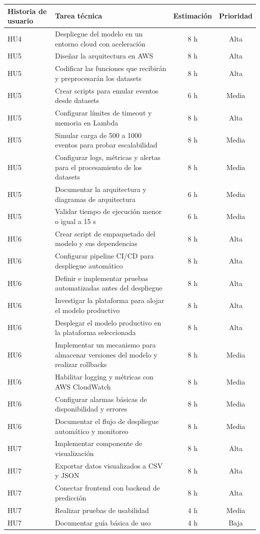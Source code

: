 \documentclass[
11pt, %
]{charter}
\begin{document}
\begin{table}[htpb]
\centering
\begin{tabularx}{\linewidth}{@{}|X|X|c|c|@{}}
\hline
\rowcolor[HTML]{C0C0C0}
Historia de usuario & Tarea técnica & Estimación & Prioridad \\ \hline
HU4 & Despliegue del modelo en un entorno cloud con aceleración 					 & 8 h & Alta \\ \hline
HU5 & Diseñar la arquitectura en AWS & 8 h & Alta \\ \hline
HU5 & Codificar las funciones que recibirán y preprocesarán los datasets 					 & 8 h & Alta \\ \hline
HU5 & Crear scripts para emular eventos desde datasets 						 & 6 h & Media \\ \hline
HU5 & Configurar límites de timeout y memoria en Lambda	 					 & 8 h & Alta \\ \hline
HU5 & Simular carga de 500 a 1000 eventos para probar escalabilidad		 					 & 8 h & Media \\ \hline
HU5 & Configurar logs, métricas y alertas para el procesamiento de los datasets 					 & 8 h & Media \\ \hline
HU5 & Documentar la arquitectura y diagramas de arquitectura 					 & 6 h & Media \\ \hline
HU5 & Validar tiempo de ejecución menor o igual a 15 s 					 & 6 h & Media \\ \hline
HU6 & Crear script de empaquetado del modelo y sus dependencias 					 & 8 h & Alta \\ \hline
HU6 & Configurar pipeline CI/CD para despliegue automático 					 & 8 h & Alta \\ \hline
HU6 & Definir e implementar pruebas automatizadas antes del despliegue 					 & 8 h & Alta \\ \hline
HU6 & Investigar la plataforma para alojar el modelo productivo  					 & 8 h & Alta \\ \hline
HU6 & Desplegar el modelo productivo en la plataforma seleccionada  					 & 8 h & Alta \\ \hline
HU6 & Implementar un mecanismo para almacenar versiones del modelo y realizar rollbacks	 					 & 8 h & Media \\ \hline
HU6 & Habilitar logging y métricas con AWS CloudWatch	 					 & 8 h & Media \\ \hline
HU6 & Configurar alarmas básicas de disponibilidad y errores	 					 & 8 h & Media \\ \hline
HU6 & Documentar el flujo de despliegue automático y monitoreo		 					 & 8 h & Media \\ \hline
HU7 & Implementar componente de visualización	 					 & 8 h & Alta \\ \hline
HU7 & Exportar datos visualizados a CSV y JSON	 					 & 8 h & Alta \\ \hline
HU7 & Conectar frontend con backend de predicción	 					 & 8 h & Alta \\ \hline
HU7 & Realizar pruebas de usabilidad 	 					 & 4 h & Media \\ \hline
HU7 & Documentar guía básica de uso 	 					 & 4 h & Baja \\ \hline
\end{tabularx}
\end{table}
\end{document}
